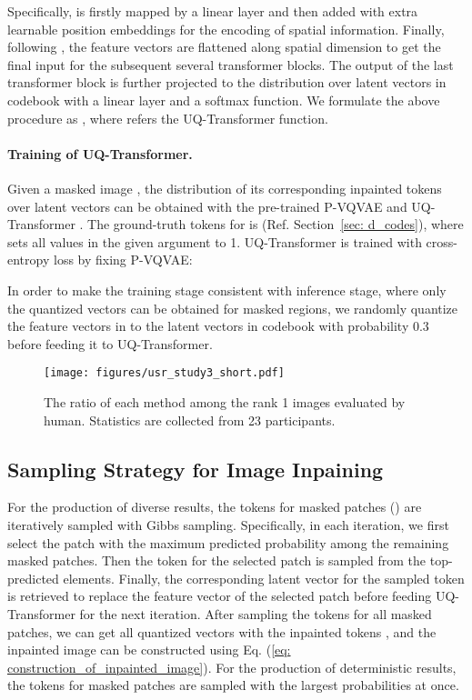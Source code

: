 \documentclass[10pt,twocolumn,letterpaper]{article}
\newcommand{\Sref}[1]{Section~\ref{#1}}
\begin{document}
Specifically,  is firstly mapped by a linear layer and then added with extra learnable position embeddings for the encoding of spatial information. Finally, following \cite{radford2019language}, the feature vectors are flattened along spatial dimension to get the final input for the subsequent several transformer blocks.
The output of the last transformer block is further projected to the distribution over  latent vectors in codebook  with a linear layer and a softmax function. We formulate the above procedure as , where  refers the UQ-Transformer function. 





\paragraph{Training of UQ-Transformer.}
Given a masked image , the distribution of its corresponding inpainted tokens over  latent vectors can be obtained with the pre-trained P-VQVAE and UQ-Transformer .
The ground-truth tokens for  is   (Ref. \Sref{sec: d_codes}), where  sets all values in the given argument to 1. 
UQ-Transformer is trained with cross-entropy loss by fixing P-VQVAE:

In order to make the training stage consistent with inference stage, where only the quantized vectors can be obtained for masked regions, we randomly quantize the feature vectors in  to the latent vectors in codebook with probability 0.3 before feeding it to UQ-Transformer. 



\begin{figure}[t]
	\centering
	\texttt{[image: figures/usr\_study3\_short.pdf]} 
    \vspace{-10pt}
\caption{The ratio of each method among the rank 1 images evaluated by human. Statistics are collected from 23 participants.}
    \vspace{-10pt}
	\label{figure: usr_study}
\end{figure}


\subsection{Sampling Strategy for Image Inpaining}
\label{sec: sampling_strategy}
For the production of diverse results, the tokens for masked patches () are iteratively sampled with Gibbs sampling. Specifically, in each iteration, we first select the patch with the maximum predicted probability among the remaining masked patches. Then the token for the selected patch is sampled from the top- predicted elements. Finally, the corresponding latent vector for the sampled token is retrieved to replace the feature vector of the selected patch before feeding UQ-Transformer for the next iteration. After sampling the tokens for all masked patches, we can get all quantized vectors  with the inpainted tokens , and the inpainted image can be constructed using Eq. (\ref{eq: construction_of_inpainted_image}). 
For the production of deterministic results, the tokens for masked patches are sampled with the largest probabilities at once.
\end{document}
